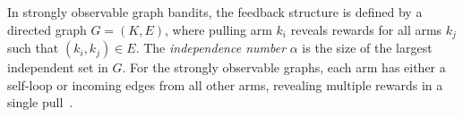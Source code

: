 
In strongly observable graph bandits, the feedback structure is defined by a directed graph $G=(K,E)$, where pulling arm $k_i$ reveals rewards for all arms $k_j$ such that $(k_i,k_j)\in E$. The \emph{independence number} $\alpha$ is the size of the largest independent set in $G$. For the strongly observable graphs, each arm has either a self-loop or incoming edges from all other arms, revealing multiple rewards in a single pull~\citep{alon2017nonstochastic}.

